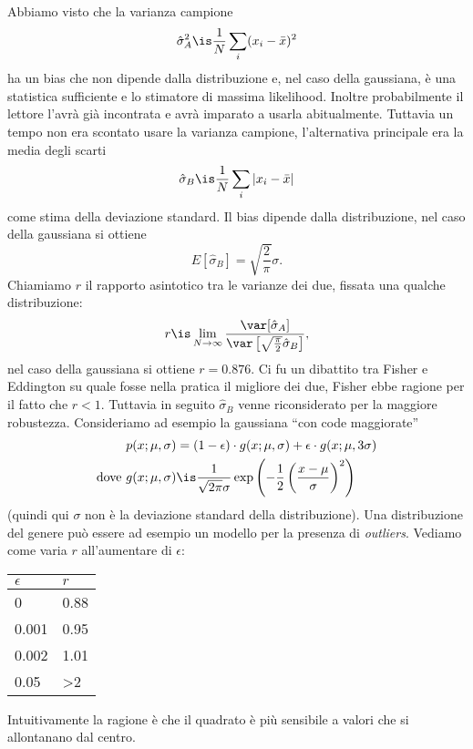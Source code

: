 \begin{example}
	Abbiamo visto che la varianza campione
	\begin{equation*}
		\hat\sigma^2_A \is \frac1N \sum_i (x_i-\bar x)^2
	\end{equation*}
	ha un bias che non dipende dalla distribuzione e,
	nel caso della gaussiana,
	è una statistica sufficiente e lo stimatore di massima likelihood.
	Inoltre probabilmente il lettore l'avrà già incontrata e avrà imparato a usarla abitualmente.
	Tuttavia un tempo non era scontato usare la varianza campione,
	l'alternativa principale era la media degli scarti
	\begin{equation*}
		\hat\sigma_B \is \frac1N \sum_i |x_i - \bar x|
	\end{equation*}
	come stima della deviazione standard.
	Il bias dipende dalla distribuzione, nel caso della gaussiana si ottiene
	\begin{equation*}
		E[\hat\sigma_B] = \sqrt{\frac2\pi} \sigma.
	\end{equation*}
	Chiamiamo $r$ il rapporto asintotico tra le varianze dei due, fissata una qualche distribuzione:
	\begin{equation*}
		r \is \lim_{N\to\infty} \frac {\var[\hat\sigma_A]} {\var\left[\sqrt{\frac\pi2}\hat\sigma_B\right]},
	\end{equation*}
	nel caso della gaussiana si ottiene $r=0.876$.
	Ci fu un dibattito tra Fisher e Eddington su quale fosse nella pratica il migliore dei due,
	Fisher ebbe ragione per il fatto che $r<1$.
	Tuttavia in seguito $\hat\sigma_B$ venne riconsiderato per la maggiore robustezza.
	Consideriamo ad esempio la gaussiana ``con code maggiorate''
	\begin{align*}
		p(x;\mu,\sigma)
		&= (1-\epsilon)\cdot g(x;\mu,\sigma) + \epsilon\cdot g(x;\mu,3\sigma) \\
		\text{dove }g(x;\mu,\sigma)
		&\is \frac1{\sqrt{2\pi}\sigma} \exp \left(-\frac12\left(\frac{x-\mu}\sigma\right)^2\right)
	\end{align*}
	(quindi qui $\sigma$ non è la deviazione standard della distribuzione).
	Una distribuzione del genere può essere ad esempio un modello per la presenza di \emph{outliers}.
	Vediamo come varia $r$ all'aumentare di $\epsilon$:
	\begin{center}
		\begin{tabular}{ll}
			$\epsilon$ & $r$ \\
			\hline
			0     & 0.88 \\
			0.001 & 0.95 \\
			0.002 & 1.01 \\
			0.05  & >2   \\
		\end{tabular}
	\end{center}
	Intuitivamente la ragione è che il quadrato è più sensibile a valori che si allontanano dal centro.
\end{example}

